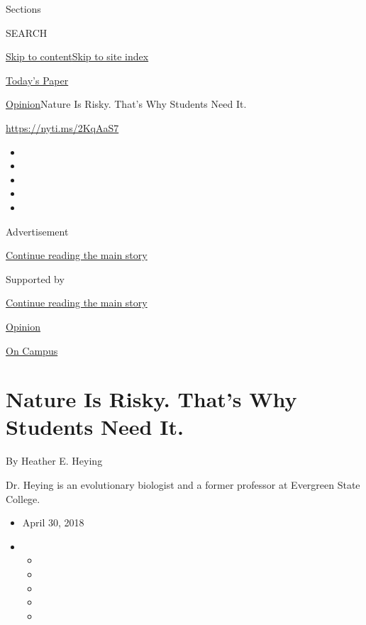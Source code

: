 Sections

SEARCH

\protect\hyperlink{site-content}{Skip to
content}\protect\hyperlink{site-index}{Skip to site index}

\href{https://myaccount.nytimes.com/auth/login?response_type=cookie\&client_id=vi}{}

\href{https://www.nytimes.com/section/todayspaper}{Today's Paper}

\href{/section/opinion}{Opinion}\textbar{}Nature Is Risky. That's Why
Students Need It.

\href{https://nyti.ms/2KqAaS7}{https://nyti.ms/2KqAaS7}

\begin{itemize}
\item
\item
\item
\item
\item
\end{itemize}

Advertisement

\protect\hyperlink{after-top}{Continue reading the main story}

Supported by

\protect\hyperlink{after-sponsor}{Continue reading the main story}

\href{/section/opinion}{Opinion}

\href{/column/on-campus}{On Campus}

\hypertarget{nature-is-risky-thats-why-students-need-it}{%
\section{Nature Is Risky. That's Why Students Need
It.}\label{nature-is-risky-thats-why-students-need-it}}

By Heather E. Heying

Dr. Heying is an evolutionary biologist and a former professor at
Evergreen State College.

\begin{itemize}
\item
  April 30, 2018
\item
  \begin{itemize}
  \item
  \item
  \item
  \item
  \item
  \end{itemize}
\end{itemize}

